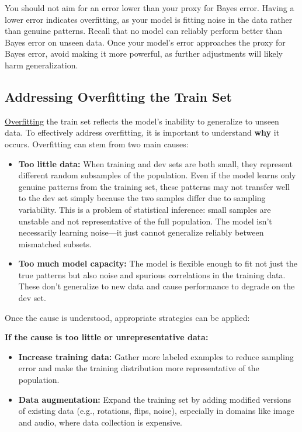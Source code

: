 \documentclass[12pt,openany, draft]{book}
\begin{document}
\begin{notebox}
You should not aim for an error lower than your proxy for Bayes error. Having a lower error indicates overfitting, as your model is fitting noise in the data rather than genuine patterns. Recall that no model can reliably perform better than Bayes error on unseen data. Once your model’s error approaches the proxy for Bayes error, avoid making it more powerful, as further adjustments will likely harm generalization.
\end{notebox}


\subsection{Addressing Overfitting the Train Set} \label{sec:addressing_variance}

\hyperref[subsec:overfitting]{Overfitting} the train set reflects the model’s inability to generalize to unseen data. To effectively address overfitting, it is important to understand \textbf{why} it occurs. Overfitting can stem from two main causes:

\begin{itemize}
    \item \textbf{Too little data:} When training and dev sets are both small, they represent different random subsamples of the population. Even if the model learns only genuine patterns from the training set, these patterns may not transfer well to the dev set simply because the two samples differ due to sampling variability. This is a problem of statistical inference: small samples are unstable and not representative of the full population. The model isn't necessarily learning noise—it just cannot generalize reliably between mismatched subsets.
    
    \item \textbf{Too much model capacity:} The model is flexible enough to fit not just the true patterns but also noise and spurious correlations in the training data. These don’t generalize to new data and cause performance to degrade on the dev set.
\end{itemize}

Once the cause is understood, appropriate strategies can be applied:

\textbf{If the cause is too little or unrepresentative data:}
\begin{itemize}
    \item \textbf{Increase training data:} Gather more labeled examples to reduce sampling error and make the training distribution more representative of the population.
    \item \textbf{Data augmentation:} Expand the training set by adding modified versions of existing data (e.g., rotations, flips, noise), especially in domains like image and audio, where data collection is expensive.
\end{itemize}
\end{document}
